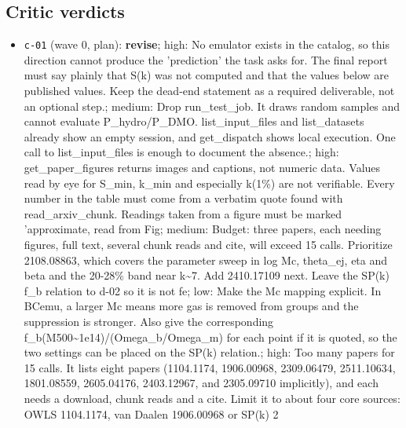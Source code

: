 \documentclass[11pt,a4paper]{article}
\begin{document}
\subsection{Critic verdicts}
\begin{itemize}
  \item \texttt{c-01} (wave 0, plan): \textbf{revise}; high: No emulator exists in the catalog, so this direction cannot produce the 'prediction' the task asks for. The final report must say plainly that S(k) was not computed and that the values below are published values. Keep the dead-end statement as a required deliverable, not an optional step.; medium: Drop run\_test\_job. It draws random samples and cannot evaluate P\_hydro/P\_DMO. list\_input\_files and list\_datasets already show an empty session, and get\_dispatch shows local execution. One call to list\_input\_files is enough to document the absence.; high: get\_paper\_figures returns images and captions, not numeric data. Values read by eye for S\_min, k\_min and especially k(1\%) are not verifiable. Every number in the table must come from a verbatim quote found with read\_arxiv\_chunk. Readings taken from a figure must be marked 'approximate, read from Fig; medium: Budget: three papers, each needing figures, full text, several chunk reads and cite, will exceed 15 calls. Prioritize 2108.08863, which covers the parameter sweep in log Mc, theta\_ej, eta and beta and the 20-28\% band near k\textasciitilde{}7. Add 2410.17109 next. Leave the SP(k) f\_b relation to d-02 so it is not fe; low: Make the Mc mapping explicit. In BCemu, a larger Mc means more gas is removed from groups and the suppression is stronger. Also give the corresponding f\_b(M500\textasciitilde{}1e14)/(Omega\_b/Omega\_m) for each point if it is quoted, so the two settings can be placed on the SP(k) relation.; high: Too many papers for 15 calls. It lists eight papers (1104.1174, 1906.00968, 2309.06479, 2511.10634, 1801.08559, 2605.04176, 2403.12967, and 2305.09710 implicitly), and each needs a download, chunk reads and a cite. Limit it to about four core sources: OWLS 1104.1174, van Daalen 1906.00968 or SP(k) 2

\end{itemize}
\end{document}

